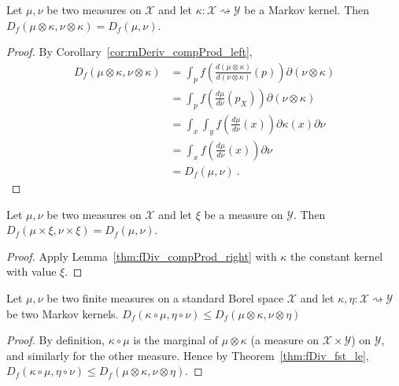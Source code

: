 \begin{lemma}
  \label{thm:fDiv_compProd_right}
  \leanok
  Let $\mu, \nu$ be two measures on $\mathcal X$ and let $\kappa : \mathcal X \rightsquigarrow \mathcal Y$ be a Markov kernel.
  Then $D_f(\mu \otimes \kappa, \nu \otimes \kappa) = D_f(\mu, \nu)$.
\end{lemma}

\begin{proof}\leanok
{}
By Corollary~\ref{cor:rnDeriv_compProd_left},
\begin{align*}
D_f(\mu \otimes \kappa, \nu \otimes \kappa)
&= \int_{p} f\left(\frac{d (\mu \otimes \kappa)}{d (\nu \otimes \kappa)}(p)\right) \partial(\nu \otimes \kappa)
\\
&= \int_{p} f\left(\frac{d \mu}{d \nu}(p_X)\right) \partial(\nu \otimes \kappa)
\\
&= \int_x \int_y f\left(\frac{d \mu}{d \nu}(x)\right) \partial \kappa(x) \partial \nu
\\
&= \int_x f\left(\frac{d \mu}{d \nu}(x)\right) \partial \nu
\\
&= D_f(\mu, \nu)
\: .
\end{align*}
\end{proof}

\begin{corollary}
  \label{cor:fDiv_prod_right}
  Let $\mu, \nu$ be two measures on $\mathcal X$ and let $\xi$ be a measure on $\mathcal Y$.
  Then $D_f(\mu \times \xi, \nu \times \xi) = D_f(\mu, \nu)$.
\end{corollary}

\begin{proof}
Apply Lemma~\ref{thm:fDiv_compProd_right} with $\kappa$ the constant kernel with value $\xi$.
\end{proof}

\begin{lemma}
  \label{lem:fDiv_comp_le_compProd}
  \leanok
  Let $\mu, \nu$ be two finite measures on a standard Borel space $\mathcal X$ and let $\kappa, \eta : \mathcal X \rightsquigarrow \mathcal Y$ be two Markov kernels.
  $D_f(\kappa \circ \mu, \eta \circ \nu) \le D_f(\mu \otimes \kappa, \nu \otimes \eta)$
\end{lemma}

\begin{proof}\leanok
{}
By definition, $\kappa \circ \mu$ is the marginal of $\mu \otimes \kappa$ (a measure on $\mathcal X \times \mathcal Y$) on $\mathcal Y$, and similarly for the other measure. Hence by Theorem~\ref{thm:fDiv_fst_le}, $D_f(\kappa \circ \mu, \eta \circ \nu) \le D_f(\mu \otimes \kappa, \nu \otimes \eta)$. 
\end{proof}

